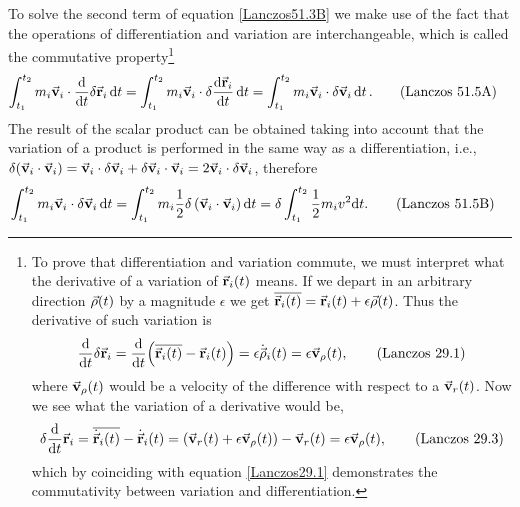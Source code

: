 \documentclass[12pt, english, a4paper]{article}
\begin{document}
To solve the second term of equation \eqref{Lanczos51.3B} we make use of the fact that the operations of differentiation and variation are interchangeable, which is called the commutative property\footnote{
To prove that differentiation and variation commute, we must interpret what the derivative of a variation of \(\va{r}_i (t)\) means.
If we depart in an arbitrary direction \(\va{\rho} (t)\) by a magnitude \(\epsilon\) we get \(\overline{\va{r}_i (t)}= \va{r}_i (t)+ \epsilon \va{\rho} (t)\).
Thus the derivative of such variation is
\begin{equation}\label{Lanczos29.1}
	\dv{t} \delta \va{r}_i= \dv{t}\pqty{\overline{\va{r}_i (t)}- \va{r}_i (t)}= \epsilon \dot{\va{\rho}}_i (t)= \epsilon \va{v}_\rho (t),
	\tag{Lanczos 29.1}
\end{equation}
where \(\va{v}_\rho (t) \) would be a velocity of the difference with respect to a \(\va{v}_r (t) \).
Now we see what the variation of a derivative would be,
\begin{equation}\label{Lanczos29.3}
	\delta \dv{t} \va{r}_i= \overline{\dot{\va{r}}_i (t)} - \dot{\va{r}}_i (t)= \pqty{\va{v}_r (t) + \epsilon \va{v}_\rho (t)}- \va{v}_r (t) = \epsilon \va{v}_\rho (t),
	\tag{Lanczos 29.3}
\end{equation}
which by coinciding with equation \eqref{Lanczos29.1} demonstrates the commutativity between variation and differentiation.
}
\begin{align}\label{Lanczos51.5A}
	\int^{t_2}_{t_1} m_i \va{v}_i \cdot \dv{t} \delta \va{r}_i \dd{t} & =
	\int^{t_2}_{t_1} m_i \va{v}_i \cdot \delta \dv{\va{r}_i}{t} \dd{t} =
	\int^{t_2}_{t_1} m_i \va{v}_i \cdot \delta \va{v}_i \dd{t}. 
	\tag{Lanczos 51.5A}
\end{align}
The result of the scalar product can be obtained taking into account that the variation of a product is performed in the same way as a differentiation, i.e., \(\delta(\va{v}_i \cdot \va{v}_i)= \va{v}_i \cdot \delta \va{v}_i +\delta \va{v}_i \cdot \va{v}_i= 2 \va{v}_i \cdot \delta \va{v}_i\), therefore
\begin{align}\label{Lanczos51.5B}
	\int^{t_2}_{t_1} m_i \va{v}_i \cdot \delta \va{v}_i \dd{t} & =
	\int^{t_2}_{t_1} m_i \frac{1}{2} \delta \left( \va{v}_i \cdot \va{v}_i \right) \dd{t} = 
	\delta \int^{t_2}_{t_1} \frac{1}{2} m_i v^2 \dd t.
	\tag{Lanczos 51.5B}
\end{align}
\end{document}
